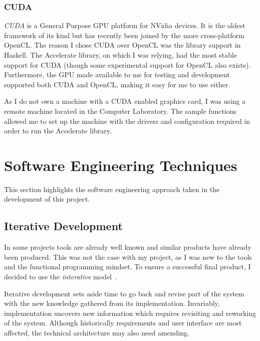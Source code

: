 \documentclass[12pt,a4paper,oneside]{scrbook}
\begin{document}
\subsubsection{CUDA}

\emph{CUDA} is a General Purpose GPU platform for NVidia devices. It is the
oldest framework of its kind but has recently been joined by the more
cross-platform OpenCL. The reason I chose CUDA over OpenCL was the library
support in Haskell. The Accelerate library, on which I was relying, had the most
stable support for CUDA (though some experimental support for OpenCL also
exists). Furthermore, the GPU made available to me for testing and development
supported both CUDA and OpenCL, making it easy for me to use either.

As I do not own a machine with a CUDA enabled graphics card, I was using a
remote machine located in the Computer Laboratory. The sample functions allowed
me to set up the machine with the drivers and configuration required in order to
run the Accelerate library.

\section{Software Engineering Techniques}

This section highlights the software engineering approach taken in the
development of this project.

\subsection{Iterative Development}
\label{sec:iterdev}

In some projects tools are already well known and similar products have already
been produced. This was not the case with my project, as I was new to the tools
and the functional programming mindset. To ensure a successful final product, I
decided to use the \emph{interative} model~\cite{cockburn08}.

Iterative development sets aside time to go back and revise part of the system
with the new knowledge gathered from its implementation. Invariably,
implementation uncovers new information which requires revisiting and reworking
of the system. Although historically requirements and user interface are most
affected, the technical architecture may also need amending.
\end{document}
